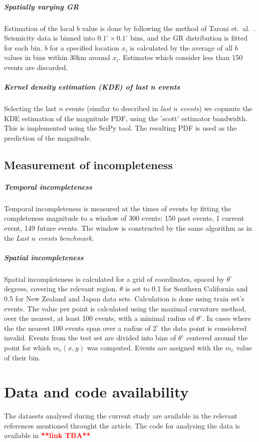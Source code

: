 \documentclass[pdflatex]{sn-jnl}
\begin{document}
\subparagraph{Spatially varying GR} Estimation of the local $b$ value is done by following the method of Taroni et.~al.~\cite{taroni_highdefinition_2021}. Seismicity data is 
binned into $0.1^\circ \times 0.1^\circ$ bins, and the GR distribution is fitted for each bin. $b$ for a specified location $x_i$ is calculated by the average of all $b$ values in bins within 30km around $x_i$. Estimates which consider less than 150 events are discarded.

\subparagraph{Kernel density estimation (KDE) of last n events} Selecting the last $n$ events (similar to described in \textit{last $n$ events}) we copmute the KDE estimation of the magnitude PDF, using the 'scott' estimator bandwidth\cite{scott_2015}. This is implemented using the SciPy tool\cite{scipy_2020}. The resulting PDF is used as the prediction of the magnitude.

\subsection{Measurement of incompleteness}
\subparagraph{Temporal incompleteness} Temporal incompleteness is measured at the times of events by fitting the completeness magnitude to a window of 300 events: 150 past events, 1 current event, 149 future events. The window is constructed by the same algorithm as in the \textit{Last $n$ events benchmark}.

\subparagraph{Spatial incompleteness} Spatial incompleteness is calculated for a grid of coordinates, spaced by $\theta^\circ$ degrees, covering the relevant region. $\theta$ is set to 0.1 for Southern California and 0.5 for New Zealand and Japan data sets. Calculation is done using train set's events. The value per point is calculated using the maximal curvature method\cite{wiemer_minimum_2000}, over the nearest, at least 100 events, with a minimal radius of $\theta^\circ$. In cases where the the nearest 100 events span over a radius of $2^\circ$ the data point is considered invalid. Events from the test set are divided into bins of $\theta^\circ$ centered around the point for which $m_c(x,y)$ was computed. Events are assigned with the $m_c$ value of their bin.


\section*{Data and code availability}
The datasets analysed during the current study are available in the relevant references mentioned throught the article.
The code for analysing the data is available in \textcolor{red}{\textbf{**link TBA**}}
\end{document}
